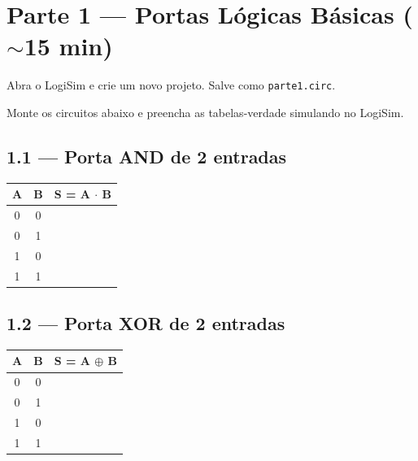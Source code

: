\documentclass[12pt,a4paper]{article}
\newcommand{\celula}{\rule{0pt}{14pt}\hspace{12pt}}
\begin{document}
\section{Parte 1 --- Portas Lógicas Básicas ($\sim$15 min)}

\begin{tcolorbox}[colback=gray!5, colframe=gray!50, fontupper=\small]
Abra o LogiSim e crie um novo projeto. Salve como \texttt{parte1.circ}.
\end{tcolorbox}

Monte os circuitos abaixo e preencha as tabelas-verdade simulando no LogiSim.

\subsection{1.1 --- Porta AND de 2 entradas}


\begin{center}
\begin{tabular}{cc|c}
\toprule
\textbf{A} & \textbf{B} & \textbf{S = A $\cdot$ B} \\
\midrule
0 & 0 & \celula \\
0 & 1 & \celula \\
1 & 0 & \celula \\
1 & 1 & \celula \\
\bottomrule
\end{tabular}
\end{center}

\subsection{1.2 --- Porta XOR de 2 entradas}

\begin{center}
\begin{tabular}{cc|c}
\toprule
\textbf{A} & \textbf{B} & \textbf{S = A $\oplus$ B} \\
\midrule
0 & 0 & \celula \\
0 & 1 & \celula \\
1 & 0 & \celula \\
1 & 1 & \celula \\
\bottomrule
\end{tabular}
\end{center}
\end{document}
